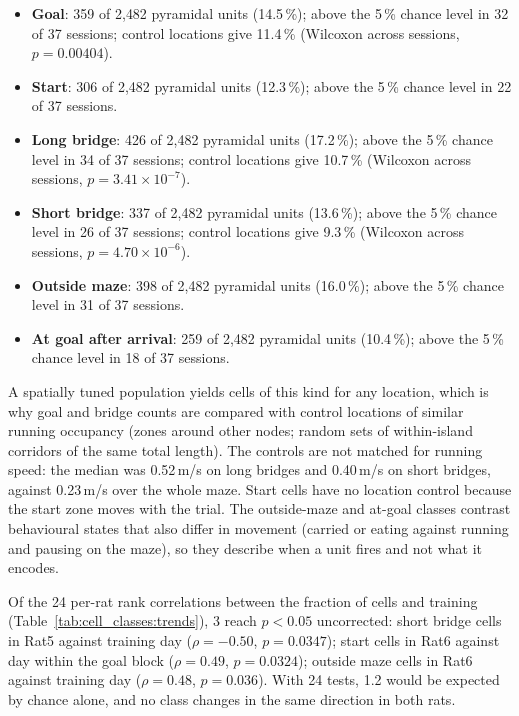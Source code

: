 \begin{itemize}\setlength{\itemsep}{0pt}
\item \textbf{Goal}: 359 of 2{,}482 pyramidal units (14.5\,\%); above the 5\,\% chance level in 32 of 37 sessions; control locations give 11.4\,\% (Wilcoxon across sessions, $p = 0.00404$).
\item \textbf{Start}: 306 of 2{,}482 pyramidal units (12.3\,\%); above the 5\,\% chance level in 22 of 37 sessions.
\item \textbf{Long bridge}: 426 of 2{,}482 pyramidal units (17.2\,\%); above the 5\,\% chance level in 34 of 37 sessions; control locations give 10.7\,\% (Wilcoxon across sessions, $p = 3.41\times10^{-7}$).
\item \textbf{Short bridge}: 337 of 2{,}482 pyramidal units (13.6\,\%); above the 5\,\% chance level in 26 of 37 sessions; control locations give 9.3\,\% (Wilcoxon across sessions, $p = 4.70\times10^{-6}$).
\item \textbf{Outside maze}: 398 of 2{,}482 pyramidal units (16.0\,\%); above the 5\,\% chance level in 31 of 37 sessions.
\item \textbf{At goal after arrival}: 259 of 2{,}482 pyramidal units (10.4\,\%); above the 5\,\% chance level in 18 of 37 sessions.
\end{itemize}

A spatially tuned population yields cells of this kind for any location, which is why goal and bridge counts are compared with control locations of similar running occupancy (zones around other nodes; random sets of within-island corridors of the same total length). The controls are not matched for running speed: the median was 0.52\,m/s on long bridges and 0.40\,m/s on short bridges, against 0.23\,m/s over the whole maze. Start cells have no location control because the start zone moves with the trial. The outside-maze and at-goal classes contrast behavioural states that also differ in movement (carried or eating against running and pausing on the maze), so they describe when a unit fires and not what it encodes.

Of the 24 per-rat rank correlations between the fraction of cells and training (Table~\ref{tab:cell_classes:trends}), 3 reach $p<0.05$ uncorrected: short bridge cells in Rat5 against training day ($\rho = -0.50$, $p = 0.0347$); start cells in Rat6 against day within the goal block ($\rho = 0.49$, $p = 0.0324$); outside maze cells in Rat6 against training day ($\rho = 0.48$, $p = 0.036$). With 24 tests, 1.2 would be expected by chance alone, and no class changes in the same direction in both rats. 

